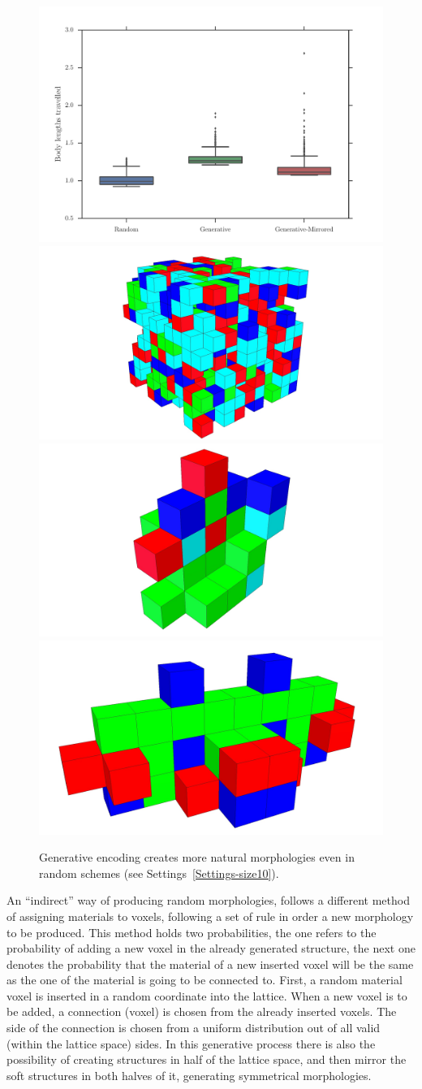 \begin{figure}
\centering
\includegraphics[width=1.0\textwidth]{../Figures/Results/random.pdf}\\
\hspace{0.1cm}
\includegraphics[height=0.15\textwidth]{../Figures/Robots/random.jpg}
\includegraphics[height=0.15\textwidth]{../Figures/Robots/rg0.jpg}
\includegraphics[height=0.15\textwidth]{../Figures/Robots/rg1.jpg}
\caption{Generative encoding creates more natural morphologies even in random schemes (see Settings~\ref{Settings-size10}).}
\label{fig:randomResultsRobots}
\end{figure}

An ``indirect'' way of producing random morphologies, follows a different method of assigning materials to voxels, following a set of rule in order a new morphology to be produced. This method holds two probabilities, the one refers to the probability of adding a new voxel in the already generated structure, the next one denotes the probability that the material of a new inserted voxel will be the same as the one of the material is going to be connected to. First, a random material voxel is inserted in a random coordinate into the lattice. When a new voxel is to be added, a connection (voxel) is chosen from the already inserted voxels. The side of the connection is chosen from a uniform distribution out of all valid (within the lattice space) sides. In this generative process there is also the possibility of creating structures in half of the lattice space, and then mirror the soft structures in both halves of it, generating symmetrical morphologies.


